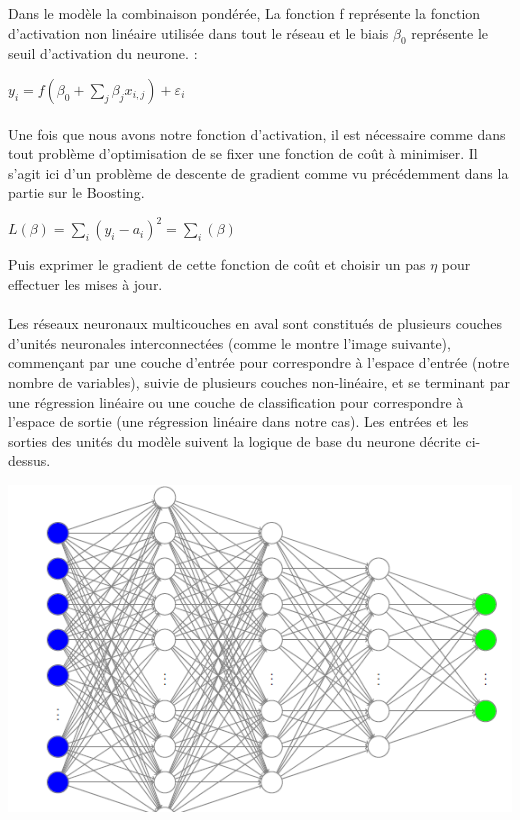 \documentclass[14pt, openany]{article}
\begin{document}
Dans le modèle la combinaison pondérée, La fonction f représente la fonction d'activation non linéaire utilisée dans tout le réseau et le biais $\beta_{0} $ représente le seuil d'activation du neurone. :
\begin{center}
$y_{i}=f(\beta_{0} + \sum\limits_{j} \beta_{j}x_{i,j}) + \varepsilon_{i}$
\end{center}

\paragraph{}
Une fois que nous avons notre fonction d'activation, il est nécessaire comme dans tout problème d'optimisation de se fixer une fonction de coût à minimiser. Il s'agit ici d'un problème de descente de gradient comme vu précédemment dans la partie sur le Boosting.

\begin{center}
$L(\beta)=\sum\limits_{i}(y_{i}-a_{i})^{2}=\sum\limits_{i}(\beta)$
\end{center}

Puis exprimer le gradient de cette fonction de coût et choisir un pas $\eta$ pour effectuer les mises à jour.

\paragraph{}
Les réseaux neuronaux multicouches en aval sont constitués de plusieurs couches d'unités neuronales interconnectées (comme le montre l'image suivante), commençant par une couche d'entrée pour correspondre à l'espace d'entrée (notre nombre de variables), suivie de plusieurs couches non-linéaire, et se terminant par une régression linéaire ou une couche de classification pour correspondre à l'espace de sortie (une régression linéaire dans notre cas). Les entrées et les sorties des unités du modèle suivent la logique de base du neurone décrite ci-dessus.

\begin{center}
\includegraphics[scale=0.7]{Images/RN.png}
\end{center}
\end{document}

